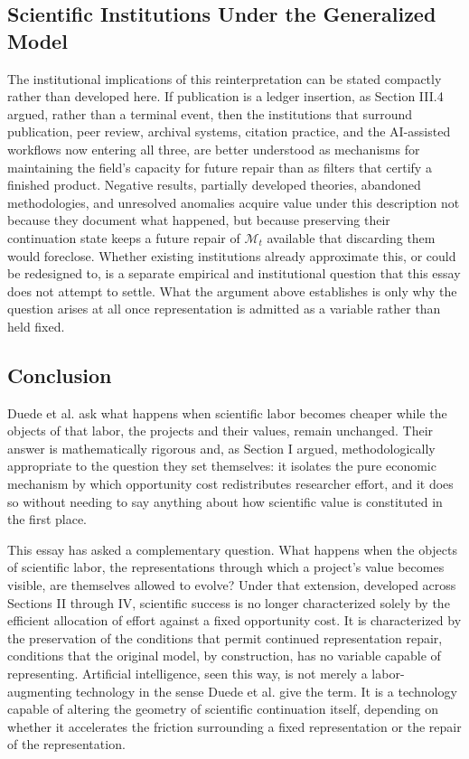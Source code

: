 \documentclass[11pt]{article}
\begin{document}
\subsection{Scientific Institutions Under the Generalized Model}

The institutional implications of this reinterpretation can be stated compactly rather than developed here. If publication is a ledger insertion, as Section III.4 argued, rather than a terminal event, then the institutions that surround publication, peer review, archival systems, citation practice, and the AI-assisted workflows now entering all three, are better understood as mechanisms for maintaining the field's capacity for future repair than as filters that certify a finished product. Negative results, partially developed theories, abandoned methodologies, and unresolved anomalies acquire value under this description not because they document what happened, but because preserving their continuation state keeps a future repair of $\mathcal{M}_t$ available that discarding them would foreclose. Whether existing institutions already approximate this, or could be redesigned to, is a separate empirical and institutional question that this essay does not attempt to settle. What the argument above establishes is only why the question arises at all once representation is admitted as a variable rather than held fixed.

\subsection{Conclusion}

Duede et al. ask what happens when scientific labor becomes cheaper while the objects of that labor, the projects and their values, remain unchanged. Their answer is mathematically rigorous and, as Section I argued, methodologically appropriate to the question they set themselves: it isolates the pure economic mechanism by which opportunity cost redistributes researcher effort, and it does so without needing to say anything about how scientific value is constituted in the first place.

This essay has asked a complementary question. What happens when the objects of scientific labor, the representations through which a project's value becomes visible, are themselves allowed to evolve? Under that extension, developed across Sections II through IV, scientific success is no longer characterized solely by the efficient allocation of effort against a fixed opportunity cost. It is characterized by the preservation of the conditions that permit continued representation repair, conditions that the original model, by construction, has no variable capable of representing. Artificial intelligence, seen this way, is not merely a labor-augmenting technology in the sense Duede et al. give the term. It is a technology capable of altering the geometry of scientific continuation itself, depending on whether it accelerates the friction surrounding a fixed representation or the repair of the representation.
\end{document}
